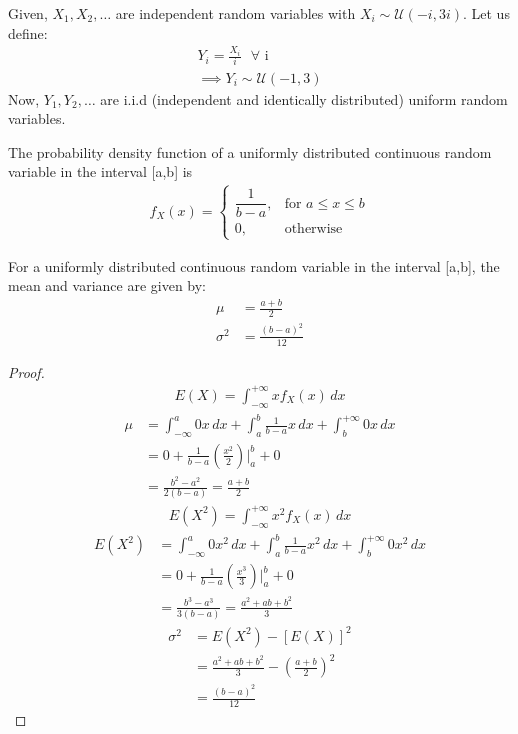 Given, $X_1,X_2,\dots$ are independent random variables with $X_i\sim \mathcal U(-i,3i)$. Let us define:
\begin{align}
    Y_i = \frac{X_i}{i}\text{ }\forall\text{ i} \\
    \implies Y_i \sim \mathcal U(-1,3)
\end{align}
Now, $Y_1,Y_2,\dots$ are i.i.d (independent and identically distributed) uniform random variables.
\begin{definition}
The probability density function of a uniformly distributed continuous random variable in the interval [a,b] is 
\begin{align}
  f_X(x) = 
  \begin{cases}
      \dfrac{1}{b-a}, & \text{for } a\leq x \leq b\\
    0, & \text{otherwise } 
  \end{cases}
\end{align}
\end{definition}
\begin{lemma} 
For a uniformly distributed continuous random variable in the interval [a,b], the mean and variance are given by:
\begin{align}
    \mu &= \frac{a+b}{2} \label{gauss/6/mu}\\
    \sigma^2 &= \frac{(b-a)^2}{12} \label{gauss/6/sigma^2}
\end{align}
\end{lemma}
\begin{proof}
\begin{align}
       E(X) = \int_{-\infty}^{+\infty} xf_X(x) \,dx
\end{align}
\begin{align}      
     \mu &= \int_{-\infty}^{a} 0 x \,dx + \int_{a}^{b} \frac{1}{b-a} x \,dx + \int_{b}^{+\infty} 0 x \,dx\\
     &= 0 + \frac{1}{b-a} \left(\frac{x^2}{2}\right)\Bigr|_{a}^{b} + 0 \\
     &= \frac{b^2 - a^2}{2(b - a)} = \frac{a+b}{2}
\end{align}
\begin{align}      
       E(X^2) = \int_{-\infty}^{+\infty} x^2f_X(x) \,dx
\end{align}
\begin{align}      
     E(X^2) &= \int_{-\infty}^{a} 0 x^2 \,dx + \int_{a}^{b} \frac{1}{b-a} x^2 \,dx + \int_{b}^{+\infty} 0 x^2 \,dx\\
     &= 0 + \frac{1}{b-a} \left(\frac{x^3}{3}\right)\Bigr|_{a}^{b} + 0 \\
     &= \frac{b^3 - a^3}{3(b - a)} = \frac{a^2 + ab + b^2}{3}
\end{align}   
\begin{align}
       \sigma^2 &= E(X^2) - [E(X)]^2 \\
       &= \frac{a^2 + ab + b^2}{3} - \left(\frac{a+b}{2}\right)^2\\
       &= \frac{(b-a)^2}{12}
\end{align}
\end{proof}
